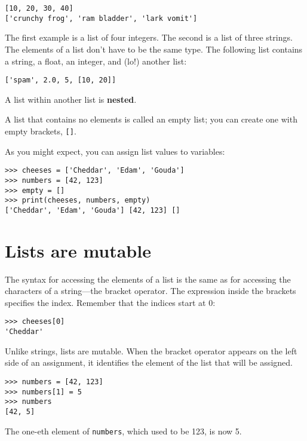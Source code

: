 \documentclass[10pt]{book}
\begin{document}
\begin{verbatim}
[10, 20, 30, 40]
['crunchy frog', 'ram bladder', 'lark vomit']
\end{verbatim}
%
The first example is a list of four integers.  The second is a list of
three strings.  The elements of a list don't have to be the same type.
The following list contains a string, a float, an integer, and
(lo!) another list:

\begin{verbatim}
['spam', 2.0, 5, [10, 20]]
\end{verbatim}
%
A list within another list is {\bf nested}.

A list that contains no elements is
called an empty list; you can create one with empty
brackets, \verb"[]".

As you might expect, you can assign list values to variables:

\begin{verbatim}
>>> cheeses = ['Cheddar', 'Edam', 'Gouda']
>>> numbers = [42, 123]
>>> empty = []
>>> print(cheeses, numbers, empty)
['Cheddar', 'Edam', 'Gouda'] [42, 123] []
\end{verbatim}
%


\section{Lists are mutable}
\label{mutable}

The syntax for accessing the elements of a list is the same as for
accessing the characters of a string---the bracket operator.  The
expression inside the brackets specifies the index.  Remember that the
indices start at 0:

\begin{verbatim}
>>> cheeses[0]
'Cheddar'
\end{verbatim}
%
Unlike strings, lists are mutable.  When the bracket operator appears
on the left side of an assignment, it identifies the element of the
list that will be assigned.

\begin{verbatim}
>>> numbers = [42, 123]
>>> numbers[1] = 5
>>> numbers
[42, 5]
\end{verbatim}
%
The one-eth element of {\tt numbers}, which
used to be 123, is now 5.
\end{document}
